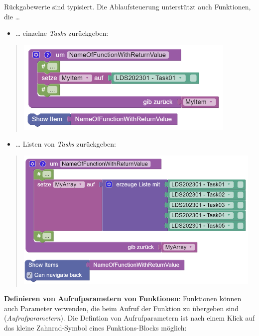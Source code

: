 \documentclass[
  letterpaper,
  DIV=11]{scrreprt}
\providecommand{\tightlist}{%
  \setlength{\itemsep}{0pt}\setlength{\parskip}{0pt}}\usepackage{longtable,booktabs,array}
\begin{document}
\begin{tcolorbox}
Rückgabewerte sind typisiert. Die Ablaufsteuerung unterstützt auch
Funktionen, die \ldots{}

\begin{itemize}
\tightlist
\item
  \ldots{} einzelne \emph{Tasks} zurückgeben:
\end{itemize}

\begin{quote}
\includegraphics[width=4.16667in,height=\textheight]{img/screenshot-blockly-function-example-return-single-item-01-DEU.png}
\end{quote}

\begin{itemize}
\tightlist
\item
  \ldots{} Listen von \emph{Tasks} zurückgeben:
\end{itemize}

\begin{quote}
\includegraphics[width=4.6875in,height=\textheight]{img/screenshot-blockly-function-example-return-list-of-item-01-DEU.png}
\end{quote}

\textbf{Definieren von Aufrufparametern von Funktionen}: Funktionen
können auch Parameter verwenden, die beim Aufruf der Funktion zu
übergeben sind (\emph{Aufrufparametern}). Die Defintion von
Aufrufparametern ist nach einem Klick auf das kleine Zahnrad-Symbol
eines Funktions-Blocks möglich:


\end{tcolorbox}
\end{document}
